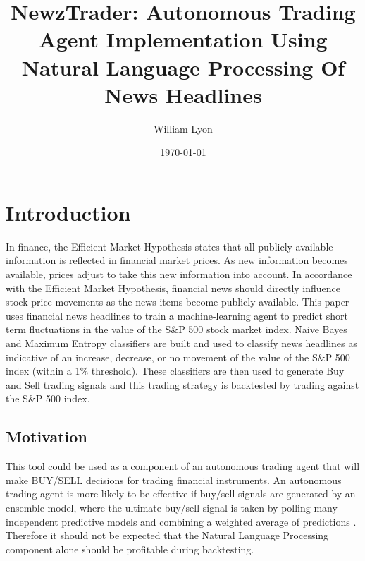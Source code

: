 \documentclass[]{article}
\begin{document}
\title{NewzTrader: Autonomous Trading Agent Implementation Using Natural Language Processing Of News Headlines}
\author{William Lyon}
\date{\today}
\maketitle
{}

\section{Introduction}
In finance, the Efficient Market Hypothesis states that all publicly available information is reflected in financial market prices.  As new information becomes available, prices adjust to take this new information into account.  In accordance with the Efficient Market Hypothesis, financial news should directly influence stock price movements as the news items become publicly available.  This paper uses financial news headlines to train a machine-learning agent to predict short term fluctuations in the value of the S\&P 500 stock market index.  Naive Bayes and Maximum Entropy classifiers are built and used to classify news headlines as indicative of an increase, decrease, or no movement of the value of the S\&P 500 index (within a 1\% threshold).  These classifiers are then used to generate Buy and Sell trading signals and this trading strategy is backtested by trading against the S\&P 500 index.     
\subsection{Motivation}
This tool could be used as a component of an autonomous trading agent that will make BUY/SELL decisions for trading financial instruments.  An autonomous trading agent is more likely to be effective if buy/sell signals are generated by an ensemble model, where the ultimate buy/sell signal is taken by polling many independent predictive models and combining a weighted average of predictions \cite{barbosa08}.  Therefore it should not be expected that the Natural Language Processing component alone should be profitable during backtesting.  
\end{document}
